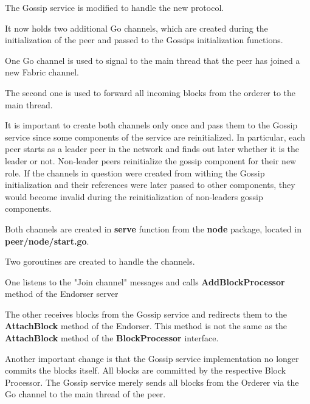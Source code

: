The Gossip service is modified to handle the new protocol.

It now holds two additional Go channels, which are created during the initialization of the peer and passed to the Gossips initialization functions.

One Go channel is used to signal to the main thread that the peer has joined a new Fabric channel.

The second one is used to forward all incoming blocks from the orderer to the main thread.

It is important to create both channels only once and pass them to the Gossip service since some components of the service are reinitialized. In particular, each peer starts as a leader peer in the network and finds out later whether it is the leader or not. Non-leader peers reinitialize the gossip component for their new role. If the channels in question were created from withing the Gossip initialization and their references were later passed to other components, they would become invalid during the reinitialization of non-leaders gossip components.

Both channels are created in \textbf{serve} function from the \textbf{node} package, located in \textbf{peer/node/start.go}.

Two goroutines are created to handle the channels.

One listens to the "Join channel" messages and calls \textbf{AddBlockProcessor} method of the Endorser server

The other receives blocks from the Gossip service and redirects them to the \textbf{AttachBlock} method of the Endorser. This method is not the same as the \textbf{AttachBlock} method of the \textbf{BlockProcessor} interface.

Another important change is that the Gossip service implementation no longer commits the blocks itself. All blocks are committed by the respective Block Processor. The Gossip service merely sends all blocks from the Orderer via the Go channel to the main thread of the peer.
